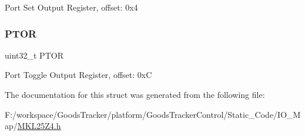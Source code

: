 Port Set Output Register, offset\+: 0x4 \mbox{\label{struct_g_p_i_o___mem_map_a2a8b6ad3b774b37fcdf9a0f04f56e43b}} 
\subsubsection{\texorpdfstring{P\+T\+OR}{PTOR}}
{\footnotesize\ttfamily uint32\+\_\+t P\+T\+OR}

Port Toggle Output Register, offset\+: 0xC 

The documentation for this struct was generated from the following file\+:\begin{DoxyCompactItemize}
\item 
F\+:/workspace/\+Goods\+Tracker/platform/\+Goods\+Tracker\+Control/\+Static\+\_\+\+Code/\+I\+O\+\_\+\+Map/\hyperlink{_m_k_l25_z4_8h}{M\+K\+L25\+Z4.\+h}\end{DoxyCompactItemize}
